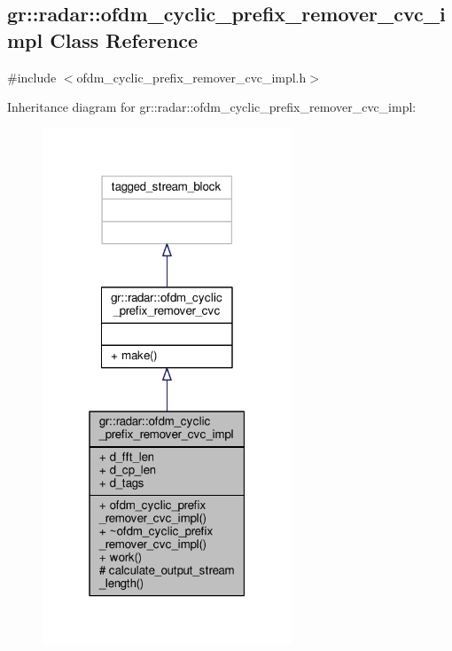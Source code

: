 \subsection{gr\+:\+:radar\+:\+:ofdm\+\_\+cyclic\+\_\+prefix\+\_\+remover\+\_\+cvc\+\_\+impl Class Reference}
\label{classgr_1_1radar_1_1ofdm__cyclic__prefix__remover__cvc__impl}


{\ttfamily \#include $<$ofdm\+\_\+cyclic\+\_\+prefix\+\_\+remover\+\_\+cvc\+\_\+impl.\+h$>$}



Inheritance diagram for gr\+:\+:radar\+:\+:ofdm\+\_\+cyclic\+\_\+prefix\+\_\+remover\+\_\+cvc\+\_\+impl\+:
\nopagebreak
\begin{figure}[H]
\begin{center}
\leavevmode
\includegraphics[width=211pt]{d9/d1d/classgr_1_1radar_1_1ofdm__cyclic__prefix__remover__cvc__impl__inherit__graph}
\end{center}
\end{figure}


